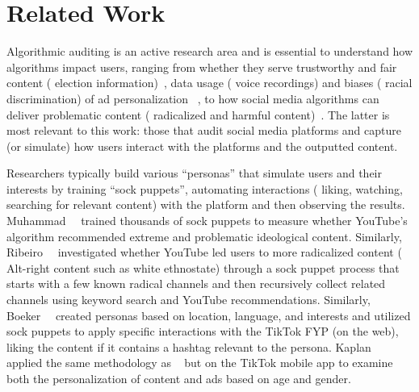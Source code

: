 \section{Related Work}
\label{sec:background-related-work}

Algorithmic auditing is an active research area and is essential to understand how algorithms impact users, ranging from whether they serve trustworthy and fair content (\eg{} election information)~\cite{PerreaultGoogleSearch,BandyFacebook,MustafarajVoterFair,RobertsonGoogleSearch}, data usage (\eg{} voice recordings) and biases (\eg{} racial discrimination) of ad personalization ~\cite{iqbal-imc-alexa,BaumannAdFair}, to how social media algorithms can deliver problematic content (\eg{} radicalized and harmful content)~\cite{HaroonYoutubePNA,RibeiroYoutubePathways,Pruccoli2022Dec,NigatuYoutube}.
The latter is most relevant to this work: those that audit social media platforms and capture (or simulate) how users interact with the platforms and the outputted content. 

Researchers typically build various ``personas'' that simulate users and their interests by training ``sock puppets'', \ie{} automating interactions (\eg{} liking, watching, searching for relevant content) with the platform and then observing the results. %
Muhammad~\etal{}~\cite{HaroonYoutubePNA} trained thousands of sock puppets to measure whether YouTube's algorithm recommended extreme and problematic ideological content. Similarly, Ribeiro~\etal{}~\cite{RibeiroYoutubePathways} investigated whether YouTube led users to more radicalized content (\eg{} Alt-right content such as white ethnostate) through a sock puppet process that starts with a few known radical channels and then recursively collect related channels using keyword search and YouTube recommendations. Similarly, Boeker~\etal{}~\cite{BoekerTikTokPersonalization} created personas based on location, language, and interests and utilized sock puppets to apply specific interactions with the TikTok FYP (on the web), \eg{} liking the content if it contains a hashtag relevant to the persona. Kaplan~\etal{}~\cite{KaplanTikTok} applied the same methodology as ~\cite{BoekerTikTokPersonalization} but on the TikTok mobile app to examine both the personalization of content and ads based on age and gender.

